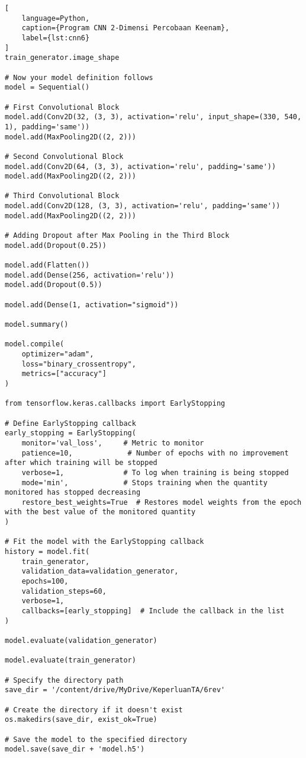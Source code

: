 \begin{lstlisting}[
    language=Python,
    caption={Program CNN 2-Dimensi Percobaan Keenam},
    label={lst:cnn6}
]
train_generator.image_shape

# Now your model definition follows
model = Sequential()

# First Convolutional Block
model.add(Conv2D(32, (3, 3), activation='relu', input_shape=(330, 540, 1), padding='same'))
model.add(MaxPooling2D((2, 2)))

# Second Convolutional Block
model.add(Conv2D(64, (3, 3), activation='relu', padding='same'))
model.add(MaxPooling2D((2, 2)))

# Third Convolutional Block
model.add(Conv2D(128, (3, 3), activation='relu', padding='same'))
model.add(MaxPooling2D((2, 2)))

# Adding Dropout after Max Pooling in the Third Block
model.add(Dropout(0.25))

model.add(Flatten())
model.add(Dense(256, activation='relu'))
model.add(Dropout(0.5))

model.add(Dense(1, activation="sigmoid"))

model.summary()

model.compile(
    optimizer="adam",
    loss="binary_crossentropy",
    metrics=["accuracy"]
)

from tensorflow.keras.callbacks import EarlyStopping

# Define EarlyStopping callback
early_stopping = EarlyStopping(
    monitor='val_loss',     # Metric to monitor
    patience=10,             # Number of epochs with no improvement after which training will be stopped
    verbose=1,              # To log when training is being stopped
    mode='min',             # Stops training when the quantity monitored has stopped decreasing
    restore_best_weights=True  # Restores model weights from the epoch with the best value of the monitored quantity
)

# Fit the model with the EarlyStopping callback
history = model.fit(
    train_generator,
    validation_data=validation_generator,
    epochs=100,
    validation_steps=60,
    verbose=1,
    callbacks=[early_stopping]  # Include the callback in the list
)

model.evaluate(validation_generator)

model.evaluate(train_generator)

# Specify the directory path
save_dir = '/content/drive/MyDrive/KeperluanTA/6rev'

# Create the directory if it doesn't exist
os.makedirs(save_dir, exist_ok=True)

# Save the model to the specified directory
model.save(save_dir + 'model.h5')


\end{lstlisting}
